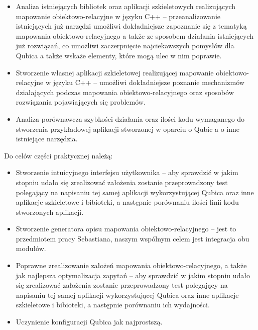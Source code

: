 \documentclass[12pt]{report}
\begin{document}
\begin{itemize}
\item Analiza istniejących bibliotek oraz aplikacji szkieletowych realizujących ma\-po\-wa\-nie obiektowo-relacyjne w języku C++ -- przeanalizowanie istniejących już narzędzi
umożliwi dokładniejsze zapoznanie się z tematyką mapowania obiektowo-relacyjnego a także ze sposobem działania istniejących już rozwiązań, co umożliwi zaczerpnięcie 
najciekawszych pomysłów dla Qubica a także wskaże elementy, które mogą ulec w nim poprawie.
\item Stworzenie własnej aplikacji szkieletowej realizującej mapowanie obiektowo-relacyjne w języku C++ -- umożliwi dokładniejsze poznanie mechanizmów działających
podczas mapowania obiektowo-relacyjnego oraz sposobów ro\-związania pojawiających się problemów.














\item Analiza porównawcza szybkości działania oraz ilości kodu wymaganego do stworzenia przykładowej aplikacji stworzonej w oparciu o Qubic a o inne istniejące narzędzia.
\end{itemize}

Do celów części praktycznej należą:

\begin{itemize}
\item Stworzenie intuicyjnego interfejsu użytkownika -- aby sprawdzić w jakim stopniu udało się zrealizować założenia zostanie przeprowadzony test po\-le\-ga\-ją\-cy na napisaniu
tej samej aplikacji wykorzystującej Qubica oraz inne aplikacje szkieletowe i bibioteki, a następnie porównaniu ilości linii kodu stworzonych aplikacji.
\item Stworzenie generatora opisu mapowania obiektowo-relacyjnego -- jest to przed\-mio\-tem pracy Sebastiana, naszym wspólnym celem jest integracja obu modułów.
\item Poprawne zrealizowanie założeń mapowania obiektowo-relacyjnego, a także jak najlepsza optymalizacja zapytań -- aby sprawdzić w jakim stopniu udało się zrealizować
założenia zostanie przeprowadzony test polegający na napisaniu tej samej aplikacji wykorzystującej Qubica oraz inne aplikacje szkieletowe i bibioteki, a następnie porównaniu
ich wydajności.
\item Uczynienie konfiguracji Qubica jak najprostszą.
\end{itemize}
\end{document}
